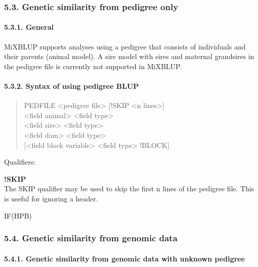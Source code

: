 \subsubsection{5.3. Genetic similarity from pedigree only}\label{Gene26}

\paragraph{5.3.1. General}\label{Gene27}

MiXBLUP supports analyses using a pedigree that consists of individuals
and their parents (animal model). A sire model with sires and maternal
grandsires in the pedigree file is currently not supported in MiXBLUP.

\paragraph{5.3.2. Syntax of using pedigree BLUP}\label{Gene28}

\begin{quote}
PEDFILE \textless pedigree file\textgreater{} {[}!SKIP \textless n
lines\textgreater{]}\\
\textless field animal\textgreater{} \textless field
type\textgreater{}\\
\textless field sire\textgreater{} \textless field type\textgreater{}\\
\textless field dam\textgreater{} \textless field type\textgreater{}\\
{[}\textless field block variable\textgreater{} \textless field
type\textgreater{} !BLOCK{]}
\end{quote}

Qualifiers:

\textbf{!SKIP }\\
The SKIP qualifier may be used to skip the first n lines of the pedigree
file. This is useful for ignoring a header.

IF(HPB)

\subsubsection{5.4. Genetic similarity from genomic data}\label{Gene29}

\paragraph{5.4.1. Genetic similarity from genomic data with unknown
pedigree}\label{Gene30}

